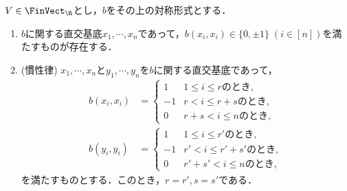 \documentclass[uplatex, dvipdfmx]{jsreport}
\begin{document}
\begin{proposition}
    $V\in\FinVect_\R$とし，$b$をその上の対称形式とする．
    \begin{enumerate}
        \item $b$に関する直交基底$x_1,\cdots,x_n$であって，$b(x_i,x_i)\in\{0,\pm 1\}\;(i\in[n])$を満たすものが存在する．
        \item (慣性律) $x_1,\cdots,x_n$と$y_1,\cdots,y_n$を$b$に関する直交基底であって，
        \begin{align*}
            b(x_i,x_i)&=\begin{cases}
                1&1\le i\le rのとき,\\
                -1&r<i\le r+sのとき,\\
                0&r+s<i\le nのとき,
            \end{cases}\\
            b(y_i,y_i)&=\begin{cases}
                1&1\le i\le r'のとき,\\
                -1&r'<i\le r'+s'のとき,\\
                0&r'+s'<i\le nのとき,
            \end{cases}
        \end{align*}
        を満たすものとする．このとき，$r=r',s=s'$である．
    \end{enumerate}
\end{proposition}
\end{document}
